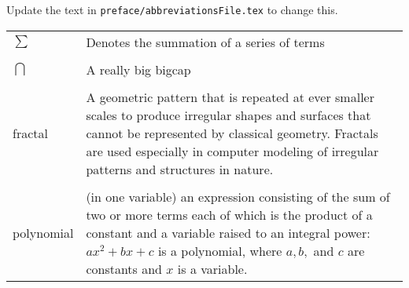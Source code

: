 Update the text in \verb|preface/abbreviationsFile.tex| to change this.

\singlespacing
\begin{tabular}{l p{5in}} 
$\sum$ & Denotes the summation of a series of terms\\
\\%
$\bigcap$ & A really big bigcap\\
\\
fractal & A geometric pattern that is repeated at ever smaller
scales to produce irregular shapes and surfaces that cannot be represented by classical
geometry. Fractals are used especially in computer modeling of irregular patterns and structures in nature.\\
\\
polynomial & (in one variable) an expression consisting of the sum of two
or more terms each of which is the product of a constant and a
variable raised to an integral power: $ax^2 + bx + c$ is a
polynomial, where $a, b,$ and $c$ are constants and $x$ is a
variable.\\

\end{tabular}
\doublespacing
